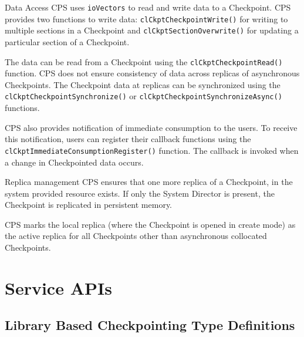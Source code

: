 \begin{flushleft}
\begin{Desc}
\item
[Data Access]
CPS uses {\tt{ioVectors}} to read and write data to a Checkpoint. CPS provides two functions to write data: 
{\tt{clCkptCheckpointWrite()}} for writing to multiple sections in a Checkpoint and 
{\tt{clCkptSectionOverwrite()}} for updating a particular section of a Checkpoint.

The data can be read from a Checkpoint using the {\tt{clCkptCheckpointRead()}} function. CPS does not ensure consistency of data across replicas
of asynchronous Checkpoints. The Checkpoint data at replicas can be synchronized using the {\tt{clCkptCheckpointSynchronize()}} or 
{\tt{clCkptCheckpointSynchronizeAsync()}} functions.  
\par
CPS also provides notification of immediate consumption to the users. To receive this notification, users can register their callback functions using 
the {\tt{clCkptImmediateConsumptionRegister()}} function. The callback is invoked when a change in Checkpointed data occurs.
\end{Desc}


\begin{Desc}
\item
[Replica management]
CPS ensures that one more replica of a Checkpoint, in the system provided resource exists. If only the System Director is present,
the Checkpoint is replicated in persistent memory.
\par
CPS marks the local replica (where the Checkpoint is opened in create mode) as the active replica for all Checkpoints other than asynchronous collocated
Checkpoints.

\end{Desc}


\chapter{Service APIs}

\section{Library Based Checkpointing Type Definitions}



\end{flushleft}
